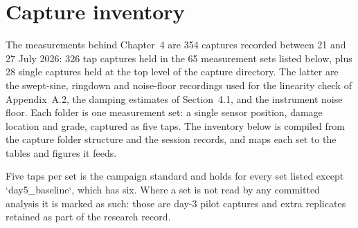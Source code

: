 %
%
%

\section{Capture inventory}
\label{app:inventory}

The measurements behind Chapter~4 are 354 captures recorded between 21 and
27 July 2026: 326 tap captures held in the 65 measurement sets listed below,
plus 28 single captures held at the top level of the capture directory. The
latter are the swept-sine, ringdown and noise-floor recordings used for the
linearity check of Appendix~A.2, the damping estimates of Section~4.1, and the
instrument noise floor. Each folder is one measurement
set: a single sensor position, damage location and grade, captured as five taps.
The inventory below is compiled from the capture folder structure and the session
records, and maps each set to the tables and figures it feeds.

Five taps per set is the campaign standard and holds for every set listed except
`day5\_baseline`, which has six.
Where a set is not read by any committed analysis it is marked as such: those are
day-3 pilot captures and extra replicates retained as part of the research
record.

